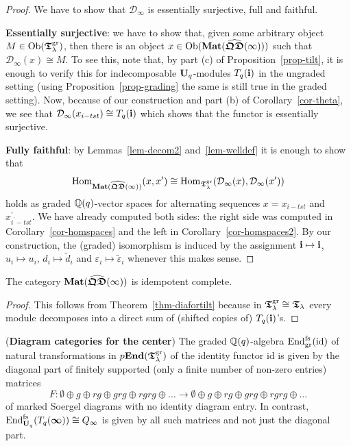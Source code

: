 \begin{proof}
We have to show that $\mathcal{D}_{\infty}$ is 
essentially surjective, full and faithful.



\textbf{Essentially surjective}: we have to show 
that, given some arbitrary object $M\in\mathrm{Ob}(\boldsymbol{\mathfrak{T}}_{\lambda}^{\mathrm{gr}})$, 
then there is an object $x\in\mathrm{Ob}(\boldsymbol{\mathrm{Mat}}(\widehat{\boldsymbol{\mathfrak{QD}}}(\infty)))$ such 
that $\mathcal{D}_{\infty}(x)\cong M$. To see this, 
note that, by part (c) of Proposition~\ref{prop-tilt}, 
it is enough to verify this for indecomposable 
$\boldsymbol{\mathrm{U}}_q$-modules $T_q({\boldsymbol{\mathrm{i}}})$ in the ungraded setting 
(using Proposition~\ref{prop-grading} the same is still true in the graded setting).
Now, because of our construction and part 
(b) of Corollary~\ref{cor-theta}, we see that 
$\mathcal{D}_{\infty}(x_{i-tst})\cong T_q({\boldsymbol{\mathrm{i}}})$ 
which shows that the functor is essentially surjective.



\textbf{Fully faithful}: by Lemmas~\ref{lem-decom2} and~\ref{lem-welldef} 
it is enough to show that
\[
\mathrm{Hom}_{\boldsymbol{\mathrm{Mat}}(\widehat{\boldsymbol{\mathfrak{QD}}}(\infty))}(x,x^{\prime})\cong\mathrm{Hom}_{\boldsymbol{\mathfrak{T}}_{\lambda}^{\mathrm{gr}}}(\mathcal{D}_{\infty}(x),\mathcal{D}_{\infty}(x^{\prime}))
\]
holds as graded $\mathbb{Q}(q)$-vector spaces for alternating sequences $x=x_{i-tst}$ and $x^{\prime}_{i^{\prime}-tst}$.
We have already computed both sides: the 
right side was computed in 
Corollary~\ref{cor-homspaces} and the 
left in Corollary~\ref{cor-homspaces2}. 
By our construction, the (graded) isomorphism 
is induced by the assignment 
$\boldsymbol{\mathrm{i}}\mapsto\boldsymbol{\mathrm{i}}$, $u_i\mapsto u_i$, 
$d_i\mapsto \tilde{d}_i$ and 
$\varepsilon_i\mapsto\tilde{\varepsilon}_i$ 
whenever this makes sense.
\end{proof}



\begin{cor}\label{cor-diafrotilt}
The category $\boldsymbol{\mathrm{Mat}}(\widehat{\boldsymbol{\mathfrak{QD}}}(\infty))$ is idempotent complete.\makeqed
\end{cor}



\begin{proof}
This follows from Theorem~\ref{thm-diafortilt} 
because in $\boldsymbol{\mathfrak{T}}_{\lambda}^{\mathrm{gr}}\cong\boldsymbol{\mathfrak{T}}_{\lambda}$ every module 
decomposes into a direct sum of (shifted copies of) $T_q({\boldsymbol{\mathrm{i}}})$'s. 
\end{proof}




\begin{cor}(\textbf{Diagram categories for the center})\label{cor-diafrocenter}
The graded $\mathbb{Q}(q)$-algebra $\mathrm{End}^{\mathrm{fs}}_{\mathrm{gr}}(\mathrm{id})$ of 
natural transformations in $p\boldsymbol{\mathrm{End}}(\boldsymbol{\mathfrak{T}}_{\lambda}^{\mathrm{gr}})$ of the 
identity functor $\mathrm{id}$ is given by the 
diagonal part of finitely supported (only a finite number of non-zero entries) matrices
\begin{equation}\label{eq-fcenter}
F\colon \emptyset\oplus g\oplus rg\oplus grg\oplus rgrg\oplus\dots\to\emptyset\oplus g\oplus rg\oplus grg\oplus rgrg\oplus\dots
\end{equation}
of marked Soergel diagrams with no identity 
diagram entry. In contrast, 
$\mathrm{End}^{\mathrm{fs}}_{\boldsymbol{\mathrm{U}}_q}(T_q({\boldsymbol{\infty}}))\cong Q_{\infty}$ is 
given by all such matrices and not just the diagonal part.\makeqed
\end{cor}



